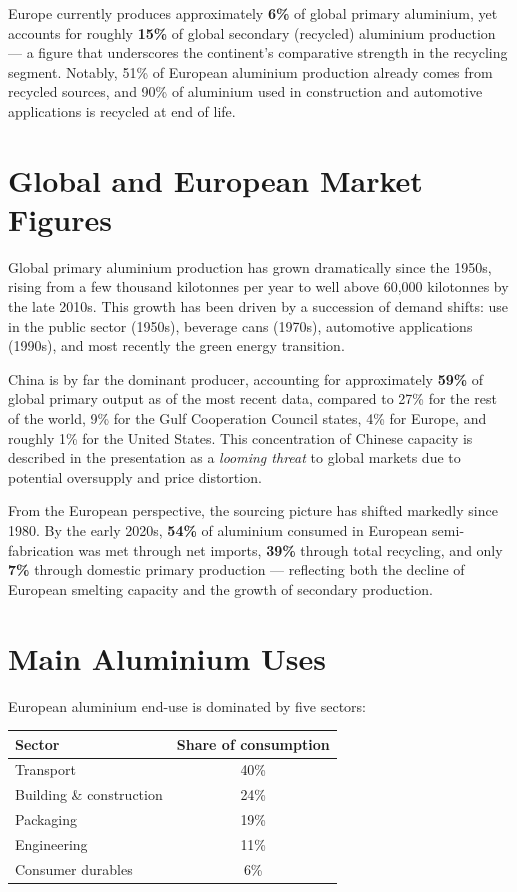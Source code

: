 Europe currently produces approximately \textbf{6\%} of global primary aluminium, yet accounts for
roughly \textbf{15\%} of global secondary (recycled) aluminium production — a figure that
underscores the continent's comparative strength in the recycling segment. Notably, 51\% of
European aluminium production already comes from recycled sources, and 90\% of aluminium used
in construction and automotive applications is recycled at end of life.

\section{Global and European Market Figures}

Global primary aluminium production has grown dramatically since the 1950s, rising from a few
thousand kilotonnes per year to well above 60{,}000 kilotonnes by the late 2010s. This growth has
been driven by a succession of demand shifts: use in the public sector (1950s), beverage cans
(1970s), automotive applications (1990s), and most recently the green energy transition.

China is by far the dominant producer, accounting for approximately \textbf{59\%} of global
primary output as of the most recent data, compared to 27\% for the rest of the world, 9\% for the
Gulf Cooperation Council states, 4\% for Europe, and roughly 1\% for the United States. This
concentration of Chinese capacity is described in the presentation as a \textit{looming threat} to
global markets due to potential oversupply and price distortion.

From the European perspective, the sourcing picture has shifted markedly since 1980. By the early
2020s, \textbf{54\%} of aluminium consumed in European semi-fabrication was met through net
imports, \textbf{39\%} through total recycling, and only \textbf{7\%} through domestic primary
production — reflecting both the decline of European smelting capacity and the growth of
secondary production.

\section{Main Aluminium Uses}

European aluminium end-use is dominated by five sectors:

\begin{center}
\begin{tabular}{lc}
\toprule
\textbf{Sector} & \textbf{Share of consumption} \\
\midrule
Transport & 40\% \\
Building \& construction & 24\% \\
Packaging & 19\% \\
Engineering & 11\% \\
Consumer durables & 6\% \\
\bottomrule
\end{tabular}
\end{center}

